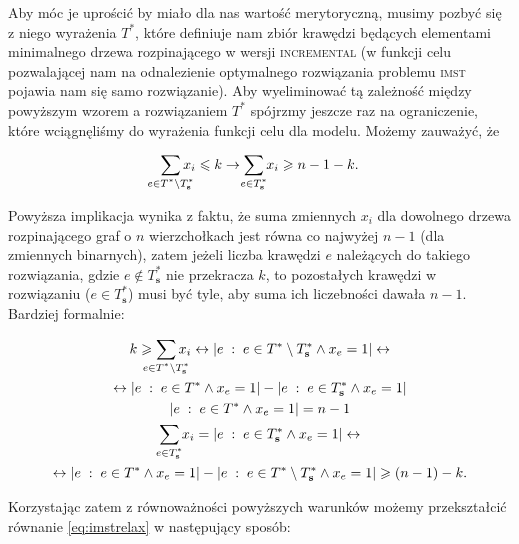 Aby móc je uprościć by miało dla nas wartość merytoryczną, musimy pozbyć się z niego wyrażenia $T^{\ast}$, które definiuje nam zbiór krawędzi będących elementami minimalnego drzewa rozpinającego w wersji \textsc{incremental} (w funkcji celu pozwalającej nam na odnalezienie optymalnego rozwiązania problemu \textsc{imst} pojawia nam się samo rozwiązanie). Aby wyeliminować tą zależność między powyższym wzorem a rozwiązaniem $T^{\ast}$ spójrzmy jeszcze raz na ograniczenie, które wciągnęliśmy do wyrażenia funkcji celu dla modelu. Możemy zauważyć, że

\begin{gather}
	\sum_{\mathclap{e \in T^{\ast} \setminus T^{\ast}_{\textbf{s}}}} x_{i} \leqslant k \rightarrow \sum_{\mathclap{e \in T^{\ast}_{\textbf{s}}}} x_{i} \geqslant n - 1 - k\text{.}
\end{gather}


Powyższa implikacja wynika z faktu, że suma zmiennych $x_{i}$ dla dowolnego drzewa rozpinającego graf o $n$ wierzchołkach jest równa co najwyżej $n - 1$ (dla zmiennych binarnych), zatem jeżeli liczba krawędzi $e$ należących do takiego rozwiązania, gdzie $e \notin T^{\ast}_{\textbf{s}}$ nie przekracza $k$, to pozostałych krawędzi w rozwiązaniu ($e \in T^{\ast}_{\textbf{s}}$) musi być tyle, aby suma ich liczebności dawała $n - 1$. Bardziej formalnie:

\begin{gather}
	k \geqslant \sum_{\mathclap{e \in T^{\ast} \setminus T^{\ast}_{\textbf{s}}}} x_{i} \leftrightarrow \left| e \; : \; e \in T^{\ast} \setminus T^{\ast}_{\textbf{s}} \wedge x_{e} = 1 \right| \leftrightarrow\\
	\leftrightarrow \left| e \; : \; e \in T^{\ast} \wedge x_{e} = 1 \right| - \left| e \; : \; e \in T^{\ast}_{\textbf{s}} \wedge x_{e} = 1 \right|\\
	\left| e \; : \; e \in T^{\ast} \wedge x_{e} = 1 \right| = n - 1\\
	\sum_{\mathclap{e \in T^{\ast}_{\textbf{s}}}} x_{i} = \left| e \; : \; e \in T^{\ast}_{\textbf{s}} \wedge x_{e} = 1 \right| \leftrightarrow\\
	\leftrightarrow \left| e \; : \; e \in T^{\ast} \wedge x_{e} = 1 \right| - \left| e \; : \; e \in T^{\ast} \setminus T^{\ast}_{\textbf{s}} \wedge x_{e} = 1 \right| \geqslant \left( n - 1 \right) - k\text{.}
\end{gather}

Korzystając zatem z równoważności powyższych warunków możemy przekształcić równanie \ref{eq:imstrelax} w następujący sposób:

